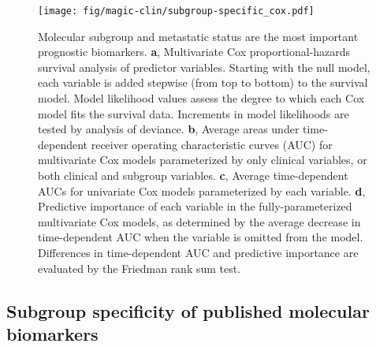 \begin{figure}[h]
	\begin{center}
		\texttt{[image: fig/magic-clin/subgroup-specific\_cox.pdf]}
	\end{center}
	\caption[Molecular subgroup and metastatic status are the most important prognostic biomarkers]
	{
	Molecular subgroup and metastatic status are the most important prognostic biomarkers.
	\textbf{a}, Multivariate Cox proportional-hazards survival analysis of predictor variables. Starting with the null model, each variable is added stepwise (from top to bottom) to the survival model. Model likelihood values assess the degree to which each Cox model fits the survival data. Increments in model likelihoods are tested by analysis of deviance. 
	\textbf{b}, Average areas under time-dependent receiver operating characteristic curves (AUC) for multivariate Cox models parameterized by only clinical variables, or both clinical and subgroup variables.
	\textbf{c}, Average time-dependent AUCs for univariate Cox models parameterized by each variable.
	\textbf{d}, Predictive importance of each variable in the fully-parameterized multivariate Cox models, as determined by the average decrease in time-dependent AUC when the variable is omitted from the model.
	Differences in time-dependent AUC and predictive importance are evaluated by the Friedman rank sum test.
	}
	\label{fig:subgroup-specific_cox}
\end{figure}

\clearpage

\subsection{Subgroup specificity of published molecular biomarkers}

